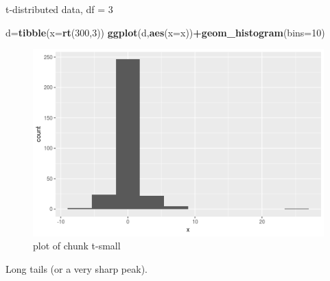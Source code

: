 \documentclass[ignorenonframetext,]{beamer}
\newenvironment{Shaded}{\begin{snugshade}}{\end{snugshade}}
\newcommand{\DataTypeTok}[1]{\textcolor[rgb]{0.13,0.29,0.53}{#1}}
\newcommand{\DecValTok}[1]{\textcolor[rgb]{0.00,0.00,0.81}{#1}}
\newcommand{\KeywordTok}[1]{\textcolor[rgb]{0.13,0.29,0.53}{\textbf{#1}}}
\newcommand{\NormalTok}[1]{#1}
\newcommand{\OperatorTok}[1]{\textcolor[rgb]{0.81,0.36,0.00}{\textbf{#1}}}
\begin{document}
\begin{frame}[fragile]{t-distributed data, df = 3}
\protect\hypertarget{t-distributed-data-df-3}{}

\begin{Shaded}
\begin{Highlighting}[]
\NormalTok{d=}\KeywordTok{tibble}\NormalTok{(}\DataTypeTok{x=}\KeywordTok{rt}\NormalTok{(}\DecValTok{300}\NormalTok{,}\DecValTok{3}\NormalTok{))}
\KeywordTok{ggplot}\NormalTok{(d,}\KeywordTok{aes}\NormalTok{(}\DataTypeTok{x=}\NormalTok{x))}\OperatorTok{+}\KeywordTok{geom_histogram}\NormalTok{(}\DataTypeTok{bins=}\DecValTok{10}\NormalTok{)}
\end{Highlighting}
\end{Shaded}

\begin{figure}
\centering
\includegraphics{figure/t-small-1.png}
\caption{plot of chunk t-small}
\end{figure}

Long tails (or a very sharp peak).

\end{frame}
\end{document}
